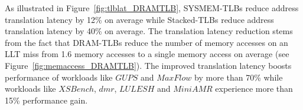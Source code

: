 As illustrated in Figure~\ref{fig:tlblat_DRAMTLB}, SYSMEM-TLBs reduce
address translation latency by 12\% on average while Stacked-TLBs
reduce address translation latency by 40\% on average. The translation
latency reduction stems from the fact that DRAM-TLBs reduce the number
of memory accesses on an LLT miss from 1.6 memory accesses to a single
memory access on average (see Figure~\ref{fig:memaccess_DRAMTLB}). The
improved translation latency boosts performance of workloads like
$GUPS$ and $MaxFlow$ by more than 70\% while workloads like $XSBench$,
$dmr$, $LULESH$ and $MiniAMR$ experience more than 15\% performance
gain.

